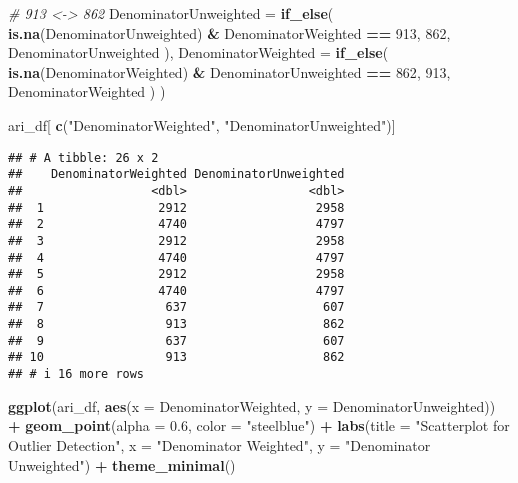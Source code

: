 \documentclass[
]{article}
\newenvironment{Shaded}{\begin{snugshade}}{\end{snugshade}}
\newcommand{\AttributeTok}[1]{\textcolor[rgb]{0.13,0.29,0.53}{#1}}
\newcommand{\CommentTok}[1]{\textcolor[rgb]{0.56,0.35,0.01}{\textit{#1}}}
\newcommand{\DecValTok}[1]{\textcolor[rgb]{0.00,0.00,0.81}{#1}}
\newcommand{\FloatTok}[1]{\textcolor[rgb]{0.00,0.00,0.81}{#1}}
\newcommand{\FunctionTok}[1]{\textcolor[rgb]{0.13,0.29,0.53}{\textbf{#1}}}
\newcommand{\NormalTok}[1]{#1}
\newcommand{\SpecialCharTok}[1]{\textcolor[rgb]{0.81,0.36,0.00}{\textbf{#1}}}
\newcommand{\StringTok}[1]{\textcolor[rgb]{0.31,0.60,0.02}{#1}}
\begin{document}
\begin{Shaded}
\begin{Highlighting}[]
    \CommentTok{\# 913 \textless{}{-}\textgreater{} 862}
    \AttributeTok{DenominatorUnweighted =} \FunctionTok{if\_else}\NormalTok{(}
      \FunctionTok{is.na}\NormalTok{(DenominatorUnweighted) }\SpecialCharTok{\&}\NormalTok{ DenominatorWeighted }\SpecialCharTok{==} \DecValTok{913}\NormalTok{,}
      \DecValTok{862}\NormalTok{,}
\NormalTok{      DenominatorUnweighted}
\NormalTok{    ),}
    \AttributeTok{DenominatorWeighted =} \FunctionTok{if\_else}\NormalTok{(}
      \FunctionTok{is.na}\NormalTok{(DenominatorWeighted) }\SpecialCharTok{\&}\NormalTok{ DenominatorUnweighted }\SpecialCharTok{==} \DecValTok{862}\NormalTok{,}
      \DecValTok{913}\NormalTok{,}
\NormalTok{      DenominatorWeighted}
\NormalTok{    )}
\NormalTok{  )}




\NormalTok{ari\_df[}
       \FunctionTok{c}\NormalTok{(}\StringTok{"DenominatorWeighted"}\NormalTok{, }\StringTok{"DenominatorUnweighted"}\NormalTok{)]}
\end{Highlighting}
\end{Shaded}

\begin{verbatim}
## # A tibble: 26 x 2
##    DenominatorWeighted DenominatorUnweighted
##                  <dbl>                 <dbl>
##  1                2912                  2958
##  2                4740                  4797
##  3                2912                  2958
##  4                4740                  4797
##  5                2912                  2958
##  6                4740                  4797
##  7                 637                   607
##  8                 913                   862
##  9                 637                   607
## 10                 913                   862
## # i 16 more rows
\end{verbatim}

\begin{Shaded}
\begin{Highlighting}[]
\FunctionTok{ggplot}\NormalTok{(ari\_df, }\FunctionTok{aes}\NormalTok{(}\AttributeTok{x =}\NormalTok{ DenominatorWeighted, }\AttributeTok{y =}\NormalTok{ DenominatorUnweighted)) }\SpecialCharTok{+}
  \FunctionTok{geom\_point}\NormalTok{(}\AttributeTok{alpha =} \FloatTok{0.6}\NormalTok{, }\AttributeTok{color =} \StringTok{"steelblue"}\NormalTok{) }\SpecialCharTok{+}
  \FunctionTok{labs}\NormalTok{(}\AttributeTok{title =} \StringTok{"Scatterplot for Outlier Detection"}\NormalTok{,}
       \AttributeTok{x =} \StringTok{"Denominator Weighted"}\NormalTok{,}
       \AttributeTok{y =} \StringTok{"Denominator Unweighted"}\NormalTok{) }\SpecialCharTok{+}
  \FunctionTok{theme\_minimal}\NormalTok{()}
\end{Highlighting}
\end{Shaded}
\end{document}
